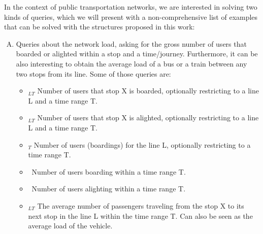 	In the context of public transportation networks, we are interested in solving two kinds of queries, which we will present with a non-comprehensive list of examples that can be solved with the structures proposed in this work:

    \begin{enumerate}[A)]
        \item Queries about the network load, asking for the gross number of users that boarded or alighted within a stop and a time/journey. Furthermore, it can be also interesting to obtain the average load of a bus or a train between any two stops from its line. Some of those queries are:
        \begin{itemize}
            \item \boardX$_{LT}$ Number of users that stop X is boarded, optionally restricting to a line L and a time range T.
            \item \alightX$_{LT}$ Number of users that stop X is alighted, optionally restricting to a line L and a time range T.
            \item \useL$_T$  Number of users (boardings) for the line L, optionally restricting to a time range T.
            \item \boardT~Number of users boarding within a time range T.
            \item \alightT~Number of users alighting within a time range T.
            \item \loadX$_{LT}$ The average number of passengers traveling from the stop X to its next stop in the line L within the time range T. Can also be seen as the average load of the vehicle.
        \end{itemize}
        

\end{enumerate}
